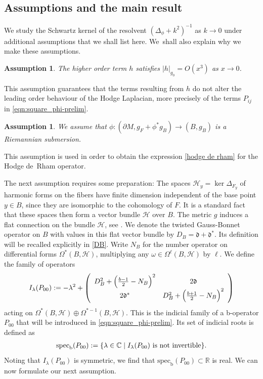 \documentclass[11pt]{article}
\numberwithin{equation}{section}
\theoremstyle{plain}
\newtheorem{assum}[Th]{Assumption}
\theoremstyle{definition}
\newcommand{\R}{{\mathbb{R}}}
\newcommand{\bb}{{\mathrm{b}}}
\newcommand{\specb}{\mathrm{spec}_\bb}
\let\w\omega
\begin{document}
\subsection{Assumptions and the main result}

We study the Schwartz kernel of the resol\-vent $(\Delta_{\phi} + k^{2})^{-1}$ as $k\to 0$ under
additional assumptions that we shall list here. We~shall also explain why we make these assumptions.

\begin{assum}\label{assum1}
The higher order term $h$ satisfies $\vert h \vert_{g_{0}} = O(x^3)$ as $x \to 0$.
\end{assum}

This assumption
guarantees that the terms resulting from $h$ do not alter the leading order behaviour of the Hodge Laplacian, more precisely of the terms $P_{ij}$ in \eqref{eqn:square_phi-prelim}.

\begin{assum}\label{assum2}
We assume that $\phi: (\partial M, g_F + \phi^*g_B)
\to (B, g_B)$ is a Riemannian submersion.
\end{assum}

This assumption is used in order to obtain the expression
\eqref{hodge de rham} for the Hodge de~Rham operator.

The next assumption requires some preparation:
The spaces $\mathscr{H}_y=\ker \Delta_{F_y}$ of harmonic forms on the fibers have
finite dimension independent of the base point $y \in B$, since they are isomorphic
to the cohomology of $F$. It is a standard fact that these spaces then form a vector bundle $\mathscr{H}$
over $B$. The metric $g$ induces a flat connection on the bundle $\mathscr{H}$, see
\cite[Prop.\,15]{gravi-ins}. We denote the twisted Gauss-Bonnet operator on $B$
with values in this flat vector bundle by $D_B = \mathfrak{d} + \mathfrak{d}^*$.
Its definition will be recalled explicitly in
\eqref{DB}. Write $N_B$ for the number operator on differential forms $\Omega^*(B,\mathscr{H})$,
multiplying any $\w \in \Omega^\ell(B,\mathscr{H})$ by $\ell$. We define the family of operators
\begin{align}\label{Indicial family}
I_\lambda(P_{00}) := -\lambda^2 + \left(\begin{array}{cc}
D^2_{B} + \Bigl(\frac{b-1}2-N_B\Bigr)^{2} &2\mathfrak{d} \\
2\mathfrak{d}^* & D^2_B + \Bigl(\frac{b+1}2-N_B\Bigr)^{2}
\end{array} \right)
\end{align}
acting on $\Omega^*(B,\mathscr{H})\oplus \Omega^{*-1}(B,\mathscr{H})$.
This is the indicial family of a b-operator $P_{00}$ that will be introduced
in \eqref{eqn:square_phi-prelim}. Its set of indicial roots is defined as
\begin{align}\label{Indicial set}
\specb(P_{00}) := \{ \lambda \in \C \mid
I_\lambda(P_{00}) \ \text{is not invertible} \}.
\end{align}
Noting that $I_\lambda(P_{00})$ is symmetric, we find that
$\specb(P_{00}) \subset \R$ is real. We can now formulate our next
assumption.
\end{document}
